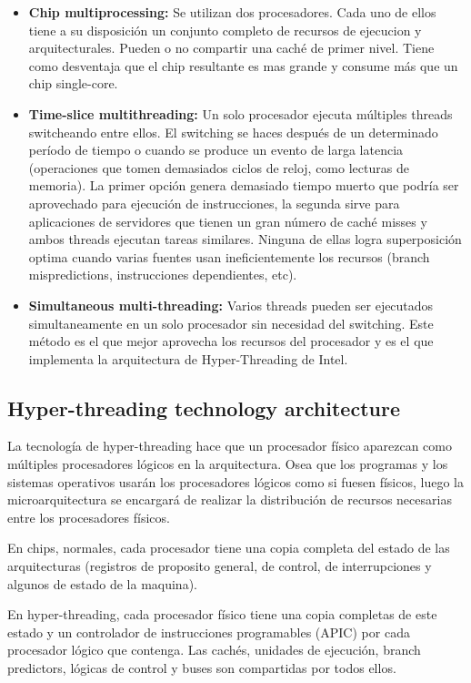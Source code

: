 \begin{itemize}
	\item \textbf{Chip multiprocessing:}
	 Se utilizan dos procesadores. Cada uno de ellos tiene a su disposición un conjunto completo de recursos de ejecucion y arquitecturales. Pueden o no compartir una caché de primer nivel. Tiene como desventaja que el chip resultante es mas grande y consume más que un chip single-core.
	\item\textbf{Time-slice multithreading:} Un solo procesador ejecuta múltiples threads switcheando entre ellos. El switching se haces después de un determinado período de tiempo o cuando se produce un evento de larga latencia (operaciones que tomen demasiados ciclos de reloj, como lecturas de memoria). La primer opción genera demasiado tiempo muerto que podría ser aprovechado para ejecución de instrucciones, la segunda sirve para aplicaciones de servidores que tienen un gran número de caché misses y ambos threads ejecutan tareas similares. Ninguna de ellas logra superposición optima cuando varias fuentes usan ineficientemente los recursos (branch mispredictions, instrucciones dependientes, etc).
	\item \textbf{Simultaneous multi-threading:} Varios threads pueden ser ejecutados simultaneamente en un solo procesador sin necesidad del switching. Este método es el que mejor aprovecha los recursos del procesador y es el que implementa la arquitectura de Hyper-Threading de Intel.
\end{itemize}

\subsection{Hyper-threading technology architecture}

La tecnología de hyper-threading hace que un procesador físico aparezcan como múltiples procesadores lógicos en la arquitectura. Osea que los programas y los sistemas operativos usarán los procesadores lógicos como si fuesen físicos, luego la microarquitectura se encargará de realizar la distribución de recursos necesarias entre los procesadores físicos.

En chips, normales, cada procesador tiene una copia completa del estado de las arquitecturas (registros de proposito general, de control, de interrupciones y algunos de estado de la maquina). 

En hyper-threading, cada procesador físico tiene una copia completas de este estado y un controlador de instrucciones programables (APIC) por cada procesador lógico que contenga.  Las cachés, unidades de ejecución, branch predictors, lógicas de control y buses son compartidas por todos ellos.

